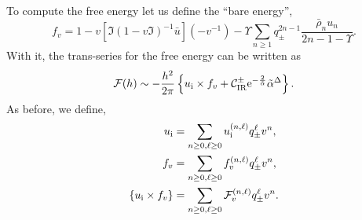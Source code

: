 \documentclass[a4paper,11pt]{article}
\theoremstyle{definition}
\newcommand{\CC}{{\cal C}}
\newcommand{\CF}{{\cal F}}
\newcommand{\re}{{\rm e}}
\newcommand{\ri}{{\rm i}}
\newcommand{\ba}{\begin{aligned}}
\newcommand{\ea}{\end{aligned}}
\begin{document}
To compute the free energy let us define the ``bare energy'',
\begin{equation}
f_v = 1 - v [\mathfrak{I}  (1-v\mathfrak{I})^{-1} \bar{u}]\left(-v^{-1}\right) - \Upsilon \sum_{n\ge 1} 
q^{2n-1}_\pm
\frac{\bar\rho_{n} u_n}{2n-1-\Upsilon}.
\end{equation}
With it, the trans-series for the free energy can be written as
\begin{equation}
\mathcal{F}(h) \sim
-\frac{h^2}{2\pi} \left\{u_\ri\times f_v + \CC_{\text{IR}}^\pm \re^{-\frac{2}{\tilde{\alpha}}}{\tilde\alpha}^\Delta \right\}.
\label{eq_freeF}
\end{equation}
As before, we define,
\begin{equation}
\ba
u_\ri &= \sum_{n\geq 0, \ell\geq 0} u_\ri^{(n,\ell)} q^\ell_\pm v^n,\\
f_v &= \sum_{n\geq 0, \ell\geq 0} f_v^{(n,\ell)} q^\ell_\pm v^n,\\
\left\{u_\ri\times f_v\right\} &= \sum_{n\geq 0, \ell\geq 0} \CF_v^{(n,\ell)} q^\ell_\pm v^n.
\ea
\end{equation}
\end{document}
